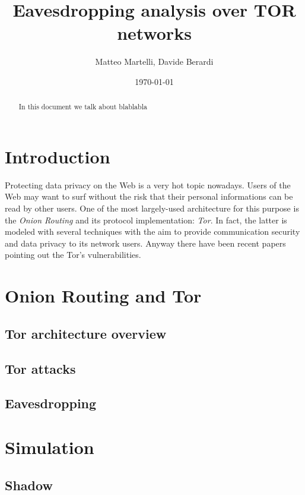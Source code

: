 \documentclass[a4paper]{article}
\title{Eavesdropping analysis over TOR networks}
\author{Matteo Martelli, Davide Berardi}
\date{\today}
\begin{document}
\maketitle

\begin{abstract}
In this document we talk about blablabla
\end{abstract}

\section{Introduction}
Protecting data privacy on the Web is a very hot topic nowadays. 
Users of the Web may want to surf without the risk that their personal
informations can be read by other users. One of the most largely-used
architecture for this purpose is the \emph{Onion Routing} and its
protocol implementation: \emph{Tor}\cite{tor}. In fact, the latter is modeled with
several techniques with the aim to provide communication security and
data privacy to its network users. Anyway there have been recent papers
 pointing out the Tor's vulnerabilities. %

\section{Onion Routing and Tor}

\subsection{Tor architecture overview}

\subsection{Tor attacks}

\subsection{Eavesdropping}

\section{Simulation}
\subsection{Shadow}
\end{document}

